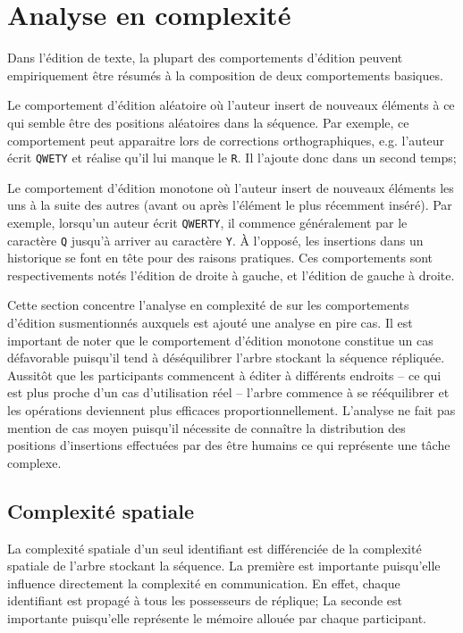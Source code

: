 
\section{Analyse en complexité}
\label{repl:sec:complexity}

Dans l'édition de texte, la plupart des comportements d'édition peuvent
empiriquement être résumés à la composition de deux comportements basiques.
\begin{inparaenum}
\item Le comportement d'édition aléatoire où l'auteur insert de nouveaux
  éléments à ce qui semble être des positions aléatoires dans la séquence. Par
  exemple, ce comportement peut apparaitre lors de corrections orthographiques,
  e.g. l'auteur écrit \texttt{QWETY} et réalise qu'il lui manque le
  \texttt{R}. Il l'ajoute donc dans un second temps;
\item Le comportement d'édition monotone où l'auteur insert de nouveaux éléments
  les uns à la suite des autres (avant ou après l'élément le plus récemment
  inséré). Par exemple, lorsqu'un auteur écrit \texttt{QWERTY}, il commence
  généralement par le caractère \texttt{Q} jusqu'à arriver au caractère
  \texttt{Y}. À l'opposé, les insertions dans un historique se font en tête pour
  des raisons pratiques. Ces comportements sont respectivements notés l'édition
  de droite à gauche, et l'édition de gauche à droite.
\end{inparaenum}

Cette section concentre l'analyse en complexité de \LSEQ sur les comportements
d'édition susmentionnés auxquels est ajouté une analyse en pire cas. Il est
important de noter que le comportement d'édition monotone constitue un cas
défavorable puisqu'il tend à déséquilibrer l'arbre stockant la séquence
répliquée. Aussitôt que les participants commencent à éditer à différents
endroits -- ce qui est plus proche d'un cas d'utilisation réel -- l'arbre
commence à se rééquilibrer et les opérations deviennent plus efficaces
proportionnellement. L'analyse ne fait pas mention de cas moyen puisqu'il
nécessite de connaître la distribution des positions d'insertions effectuées par
des être humains ce qui représente une tâche complexe.

\subsection{Complexité spatiale}
\label{repl:subsec:space}

La complexité spatiale d'un seul identifiant est différenciée de la complexité
spatiale de l'arbre stockant la séquence. La première est importante puisqu'elle
influence directement la complexité en communication. En effet, chaque
identifiant est propagé à tous les possesseurs de réplique; La seconde est
importante puisqu'elle représente le mémoire allouée par chaque participant.

